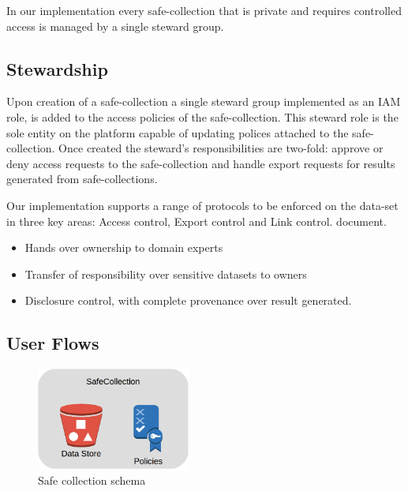 In our implementation every safe-collection that is private and requires controlled access is managed by
a single steward group.



\subsection{Stewardship}

Upon creation of a safe-collection a single steward group implemented as an IAM role, is added to the
access policies of the safe-collection. This steward role is the sole entity on the platform capable of
updating polices attached to the safe-collection. Once created the steward's responsibilities are two-fold:
approve or deny access requests to the safe-collection and handle export requests for results generated
from safe-collections.

Our implementation supports a range of protocols to be enforced on the data-set in
three key areas: Access control, Export control and Link control. 
document.

\begin{itemize}
\item Hands over ownership to domain experts
\item Transfer of responsibility over sensitive datasets to owners
\item Disclosure control, with complete provenance over result generated.
\end{itemize}


\subsection{User Flows}




\begin{figure}
  \center
  \includegraphics[width=0.45\textwidth]{figures/safecollection.png}
  \caption{Safe collection schema}
  \label{fig:safe_schema}
  \vspace{-1.5em}
\end{figure}

